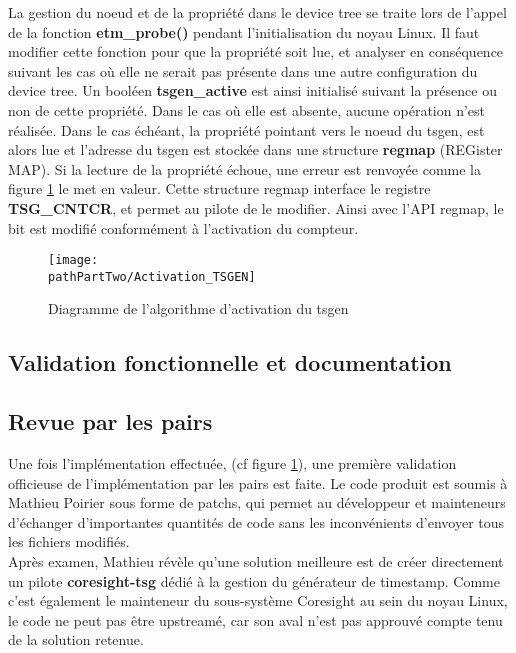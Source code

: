 La gestion du noeud et de la propriété dans le device tree se traite lors de
l'appel de la fonction \textbf{etm\_probe()} pendant l'initialisation du noyau
Linux. Il faut modifier cette fonction pour que la propriété soit lue, et
analyser en conséquence suivant les cas où elle ne serait pas présente dans
une autre configuration du device tree. Un booléen \textbf{tsgen\_active} est
ainsi initialisé suivant la présence ou non de cette propriété. Dans le cas où
elle est absente, aucune opération n'est réalisée. Dans le cas échéant, la
propriété pointant vers le noeud du tsgen, est alors lue et l'adresse du tsgen
est stockée dans une structure \textbf{regmap} (REGister MAP). Si la lecture
de la propriété échoue, une erreur est renvoyée comme la figure
\ref{fig:Activation_TSGEN} le met en valeur. Cette structure regmap interface
le registre \textbf{TSG\_CNTCR}, et permet au pilote de le modifier.  Ainsi
avec l'API regmap, le bit est modifié conformément à l'activation du compteur.

\begin{figure}[H]
	\begin{center}
		\texttt{[image: \\pathPartTwo/Activation\_TSGEN]}
		\caption{Diagramme de l'algorithme d'activation du tsgen}
	    \label{fig:Activation_TSGEN}
	\end{center}
\end{figure}

\subsection{Validation fonctionnelle et documentation}
\label{sec:validation_tests}

\subsection{Revue par les pairs}
\label{sec:peer_review}

Une fois l'implémentation effectuée, (cf figure \ref{fig:Activation_TSGEN}),
une première validation officieuse de l'implémentation par les pairs est
faite. Le code produit est soumis à Mathieu Poirier sous forme de patchs, qui
permet au développeur et mainteneurs d'échanger d'importantes quantités de
code sans les inconvénients d'envoyer tous les fichiers modifiés. \\

Après examen, Mathieu révèle qu'une solution meilleure est de créer
directement un pilote \textbf{coresight-tsg} dédié à la gestion du générateur
de timestamp. Comme c'est également le mainteneur du sous-système Coresight au
sein du noyau Linux, le code ne peut pas être upstreamé, car son aval n'est
pas approuvé compte tenu de la solution retenue.


